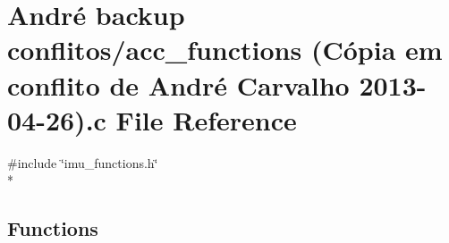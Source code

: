 \hypertarget{acc__functions_01_07C_xC3_xB3pia_01em_01conflito_01de_01Andr_xC3_xA9_01Carvalho_012013-04-26_08_8c}{\section{André backup conflitos/acc\-\_\-functions (Cópia em conflito de André Carvalho 2013-\/04-\/26).c File Reference}
\label{acc__functions_01_07C_xC3_xB3pia_01em_01conflito_01de_01Andr_xC3_xA9_01Carvalho_012013-04-26_08_8c}
}
{\ttfamily \#include \char`\"{}imu\-\_\-functions.\-h\char`\"{}}\\*
\subsection*{Functions}
